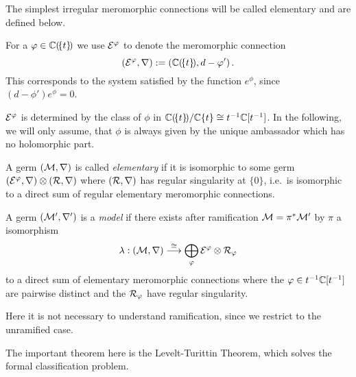 The simplest irregular meromorphic connections will be called elementary and
are defined below.
\begin{defn}
  For a $\varphi\in\mathbb{C}(\!\{t\}\!)$ we use $\mathcal{E}^{\varphi}$ to denote the meromorphic
  connection
  \[
    (\mathcal{E}^{\varphi},\nabla):=(\mathbb{C}(\!\{t\}\!),d-\varphi')\,.
  \]
  This corresponds to the system satisfied by the function $e^\phi$, since
  $(d-\phi')e^\phi=0$.
  \begin{s-prop}\label{cor:uniqueAmbassadorForPhi}
    $\mathcal{E}^\varphi$ is determined by the class of $\phi$ in
    $\mathbb{C}(\!\{t\}\!)/\mathbb{C}\{t\}\cong t^{-1}\mathbb{C}[t^{-1}]$. In the following, we will
    only assume, that $\phi$ is always given by the unique ambassador which has
    no holomorphic part.
  \end{s-prop}
  A germ $(\mathcal{M},\nabla)$ is called \emph{elementary} if it is isomorphic to some
  germ $(\mathcal{E}^\varphi,\nabla)\otimes(\mathcal{R},\nabla)$ where $(\mathcal{R},\nabla)$ has regular
  singularity at $\{0\}$, i.e.\ is isomorphic to a direct sum of regular
  elementary meromorphic connections.
\end{defn}
\begin{defn}\label{defn:model}
  \def\myPhi{\textcolor{red!60!black}{\phi}}
  \def\myE{\textcolor{green!40!black}{\cE^{\myPhi}}}
  A germ $(\mathcal{M}',\nabla')$ is a \emph{model} if there exists after ramification
  $\mathcal{M}=\pi^*\mathcal{M}'$ by $\pi$ a isomorphism
  \[
    \lambda:(\mathcal{M},\nabla) \overset{\cong}{\longrightarrow}
    \bigoplus_{\varphi} \mathcal{E}^\varphi \otimes \mathcal{R}_{\varphi}
  \]
  to a direct sum of elementary meromorphic connections where the
  $\varphi\in t^{-1}\mathbb{C}[t^{-1}]$ are pairwise distinct and the $\mathcal{R}_{\varphi}$ have
  regular singularity.
  \begin{s-rem}
    Here it is not necessary to understand ramification, since we restrict to
    the unramified case.
  \end{s-rem}
\end{defn}
The important theorem here is the Levelt-Turittin Theorem, which solves the
formal classification problem.
